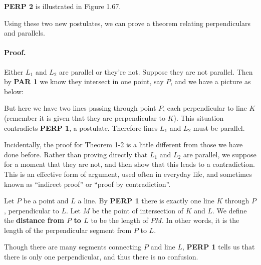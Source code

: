 \documentclass[12pt]{book} %
\begin{document}

\textbf{PERP 2} is illustrated in Figure 1.67.


Using these two new postulates, we can prove a theorem relating perpendiculars and parallels.



\paragraph{Proof.}
Either $L_1$ and $L_2$ are parallel or they're not. Suppose they are not parallel. Then by \textbf{PAR 1} we know they intersect in one point, say $P$, and we have a picture as below:


But here we have two lines passing through point $P$, each perpendicular to line $K$ (remember it is given that they are perpendicular to $K$). This situation contradicts \textbf{PERP 1}, a postulate. Therefore lines $L_1$ and $L_2$ must be parallel.

Incidentally, the proof for Theorem 1-2 is a little different from those we have done before. Rather than proving directly that $L_1$ and $L_2$ are parallel, we suppose for a moment that they are not, and then show that this leads to a contradiction. This is an effective form of argument, used often in everyday life, and sometimes known as ``indirect proof'' or ``proof by contradiction''.

Let $P$ be a point and $L$ a line. By \textbf{PERP 1} there is exactly one line $K$ through $P$, perpendicular to $L$. Let $M$ be the point of intersection of $K$ and $L$. We define the \textbf{distance from $P$ to $L$} to be the length of $PM$. In other words, it is the length of the perpendicular segment from $P$ to $L$.


Though there are many segments connecting $P$ and line $L$, \textbf{PERP 1} tells us that there is only one perpendicular, and thus there is no confusion.
\end{document}
